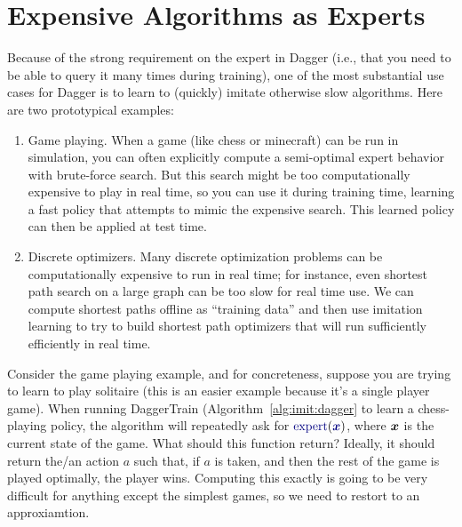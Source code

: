 \section{Expensive Algorithms as Experts}

Because of the strong requirement on the expert in Dagger (i.e., that you need to be able to query it many times during training), one of the most substantial use cases for Dagger is to learn to (quickly) imitate otherwise slow algorithms.
Here are two prototypical examples:
\begin{enumerate}
\item Game playing. When a game (like chess or minecraft) can be run in simulation, you can often explicitly compute a semi-optimal expert behavior with brute-force search. But this search might be too computationally expensive to play in real time, so you can use it during training time, learning a fast policy that attempts to mimic the expensive search. This learned policy can then be applied at test time.

\item Discrete optimizers. Many discrete optimization problems can be computationally expensive to run in real time; for instance, even shortest path search on a large graph can be too slow for real time use. We can compute shortest paths offline as ``training data'' and then use imitation learning to try to build shortest path optimizers that will run sufficiently efficiently in real time.
\end{enumerate}

Consider the game playing example, and for concreteness, suppose you are trying to learn to play solitaire (this is an easier example because it's a single player game).
When running DaggerTrain (Algorithm~\ref{alg:imit:dagger} to learn a chess-playing policy, the algorithm will repeatedly ask for $\VARm{\text{expert}}(\VARm{\vx})$, where ${\boldsymbol{x}}$ is the current state of the game.
What should this function return?
Ideally, it should return the/an action $a$ such that, if $a$ is taken, and then the rest of the game is played optimally, the player wins.
Computing this exactly is going to be very difficult for anything except the simplest games, so we need to restort to an approxiamtion.

